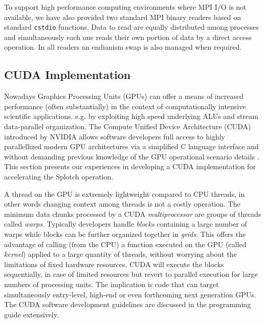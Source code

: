 To support high performance computing environments where MPI I/O is not available, 
we have also provided two standard MPI binary readers based on standard {\tt cstdio} functions.
Data to read are equally distributed among processes and simultaneously each one reads
their own portion of data by a direct access operation. 
%
In all readers an endianism swap is also managed when required.



\subsection{CUDA Implementation}
\label{cuda}
Nowadays Graphics Processing Units (GPUs) can offer a means of increased performance 
(often substantially) in the context of computationally intensive scientific applications, 
e.g. by exploiting high speed underlying ALUs and stream data-parallel organization. 
The Compute Unified Device Architecture (CUDA) introduced by NVIDIA allows software 
developers full access to highly parallellized modern GPU architectures via a 
simplified C language interface and without demanding previous knowledge of the 
GPU operational scenario details \cite{cuda}. This section presents our experiences 
in developing a CUDA implementation for accelerating the Splotch operation.

A thread on the GPU is extremely lightweight compared to CPU threads, in other 
words changing context among threads is not a costly operation. The minimum 
data chunks processed by a CUDA {\it multiprocessor} are groups of threads called 
{\it warps}. Typically developers handle {\it blocks} containing a large number 
of warps while blocks can be further organized together in {\it grids}. This 
offers the advantage of calling (from the CPU) a function executed on the GPU 
(called {\it kernel}) applied to a large quantity of threads, without worrying about 
the limitations of fixed hardware resources. CUDA will execute the blocks sequentially, 
in case of limited resources but revert to parallel execution for large numbers 
of processing units.  The implication is code that can target simultaneously 
entry-level, high-end or even forthcoming next generation GPUs. The CUDA software 
development guidelines are discussed in the programming guide \cite{cudaprogguide} 
extensively.

